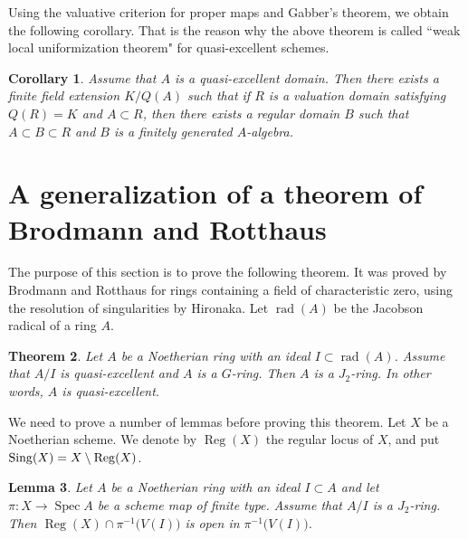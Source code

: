 \documentclass[11pt,a4paper]{amsart}
\newtheorem{theorem}{Theorem}[section]
\newtheorem{lemma}[theorem]{Lemma}
\newtheorem{corollary}[theorem]{Corollary}
\theoremstyle{definition}
\theoremstyle{remark}
\newcommand{\Spec}{\operatorname{Spec}}
\newcommand{\rad}{\operatorname{rad}}
\newcommand{\Reg}{\operatorname{Reg}}
\begin{document}
Using the valuative criterion for proper maps and Gabber's theorem, we obtain the following corollary. That is the reason why the above theorem is called ``weak local uniformization theorem" for quasi-excellent schemes.



\begin{corollary}
Assume that $A$ is a quasi-excellent domain. Then there exists a finite field extension $K/Q(A)$ such that if $R$ is a valuation domain satisfying $Q(R)=K$ and $A \subset R$, then there exists a regular domain $B$ such that $A \subset B \subset R$ and $B$ is a finitely generated $A$-algebra.
\end{corollary}






\section{A generalization of a theorem of Brodmann and Rotthaus}
\label{quasi-excellent3}


The purpose of this section is to prove the following theorem. It was proved by Brodmann and Rotthaus \cite{BroRot80} for rings containing a field of characteristic zero, using the resolution of singularities by Hironaka. Let $\rad(A)$ be the Jacobson radical of a ring $A$.


\begin{theorem}
\label{BrodmannRotthaus}
Let $A$ be a Noetherian ring with an ideal $I \subset \rad(A)$. Assume that $A/I$ is quasi-excellent and $A$ is a $G$-ring. Then $A$ is a $J_2$-ring. In other words, $A$ is quasi-excellent.
\end{theorem}


We need to prove a number of lemmas before proving this theorem. Let $X$ be a Noetherian scheme. We denote by
$\Reg(X)$ the regular locus of $X$,
and put ${\rm Sing}(X) = X \setminus \Reg(X)$.



\begin{lemma}
\label{lemmaopenset}
Let $A$ be a Noetherian ring with an ideal $I \subset A$ and
let $\pi:X \to \Spec A$ be a scheme map of finite type. Assume that $A/I$ is a $J_2$-ring. Then $\Reg(X) \cap \pi^{-1}\big(V(I)\big)$ is open in $\pi^{-1}\big(V(I)\big)$.
\end{lemma}
\end{document}
